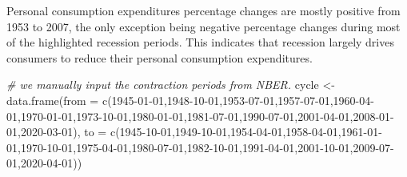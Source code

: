 \documentclass[
]{article}
\newenvironment{Shaded}{\begin{snugshade}}{\end{snugshade}}
\newcommand{\AttributeTok}[1]{\textcolor[rgb]{0.77,0.63,0.00}{#1}}
\newcommand{\CommentTok}[1]{\textcolor[rgb]{0.56,0.35,0.01}{\textit{#1}}}
\newcommand{\FunctionTok}[1]{\textcolor[rgb]{0.00,0.00,0.00}{#1}}
\newcommand{\NormalTok}[1]{#1}
\newcommand{\OtherTok}[1]{\textcolor[rgb]{0.56,0.35,0.01}{#1}}
\newcommand{\StringTok}[1]{\textcolor[rgb]{0.31,0.60,0.02}{#1}}
\begin{document}
Personal consumption expenditures percentage changes are mostly positive
from 1953 to 2007, the only exception being negative percentage changes
during most of the highlighted recession periods. This indicates that
recession largely drives consumers to reduce their personal consumption
expenditures.

\begin{Shaded}
\begin{Highlighting}[]
\CommentTok{\# we manually input the contraction periods from NBER. }
\NormalTok{cycle }\OtherTok{\textless{}{-}} \FunctionTok{data.frame}\NormalTok{(}\AttributeTok{from =} \FunctionTok{c}\NormalTok{(}\StringTok{\textquotesingle{}1945{-}01{-}01\textquotesingle{}}\NormalTok{,}\StringTok{\textquotesingle{}1948{-}10{-}01\textquotesingle{}}\NormalTok{,}\StringTok{\textquotesingle{}1953{-}07{-}01\textquotesingle{}}\NormalTok{,}\StringTok{\textquotesingle{}1957{-}07{-}01\textquotesingle{}}\NormalTok{,}\StringTok{\textquotesingle{}1960{-}04{-}01\textquotesingle{}}\NormalTok{,}\StringTok{\textquotesingle{}1970{-}01{-}01\textquotesingle{}}\NormalTok{,}\StringTok{\textquotesingle{}1973{-}10{-}01\textquotesingle{}}\NormalTok{,}\StringTok{\textquotesingle{}1980{-}01{-}01\textquotesingle{}}\NormalTok{,}\StringTok{\textquotesingle{}1981{-}07{-}01\textquotesingle{}}\NormalTok{,}\StringTok{\textquotesingle{}1990{-}07{-}01\textquotesingle{}}\NormalTok{,}\StringTok{\textquotesingle{}2001{-}04{-}01\textquotesingle{}}\NormalTok{,}\StringTok{\textquotesingle{}2008{-}01{-}01\textquotesingle{}}\NormalTok{,}\StringTok{\textquotesingle{}2020{-}03{-}01\textquotesingle{}}\NormalTok{),}
                    \AttributeTok{to =} \FunctionTok{c}\NormalTok{(}\StringTok{\textquotesingle{}1945{-}10{-}01\textquotesingle{}}\NormalTok{,}\StringTok{\textquotesingle{}1949{-}10{-}01\textquotesingle{}}\NormalTok{,}\StringTok{\textquotesingle{}1954{-}04{-}01\textquotesingle{}}\NormalTok{,}\StringTok{\textquotesingle{}1958{-}04{-}01\textquotesingle{}}\NormalTok{,}\StringTok{\textquotesingle{}1961{-}01{-}01\textquotesingle{}}\NormalTok{,}\StringTok{\textquotesingle{}1970{-}10{-}01\textquotesingle{}}\NormalTok{,}\StringTok{\textquotesingle{}1975{-}04{-}01\textquotesingle{}}\NormalTok{,}\StringTok{\textquotesingle{}1980{-}07{-}01\textquotesingle{}}\NormalTok{,}\StringTok{\textquotesingle{}1982{-}10{-}01\textquotesingle{}}\NormalTok{,}\StringTok{\textquotesingle{}1991{-}04{-}01\textquotesingle{}}\NormalTok{,}\StringTok{\textquotesingle{}2001{-}10{-}01\textquotesingle{}}\NormalTok{,}\StringTok{\textquotesingle{}2009{-}07{-}01\textquotesingle{}}\NormalTok{,}\StringTok{\textquotesingle{}2020{-}04{-}01\textquotesingle{}}\NormalTok{))}
\end{Highlighting}
\end{Shaded}
\end{document}
